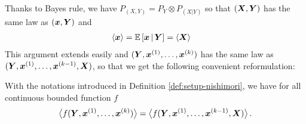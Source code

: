 \documentclass[12pt,nocut]{article}
\begin{document}
Thanks to Bayes rule, we have $P_{(X,Y)} = P_{Y}\!\otimes \! P_{(X|Y)}$ so that $({\boldsymbol X},{\boldsymbol Y})$ has the same law as $({\boldsymbol x},{\boldsymbol Y})$ and
\begin{align*}
\langle {\boldsymbol x} \rangle &= \mathbb{E}\left[ {\boldsymbol x} \, | \, {\boldsymbol Y} \right] = \langle {\boldsymbol X} \rangle
\end{align*}
This argument extends easily and $({\boldsymbol Y},{\boldsymbol x}^{(1)}, \dots, {\boldsymbol x}^{(k)})$ has the same law as $({\boldsymbol Y},{\boldsymbol x}^{(1)}, \dots,{\boldsymbol x}^{(k-1)}, {\boldsymbol X})$, so that we get the following convenient reformulation:
\begin{proposition} \label{prop:nishimori}
With the notations introduced in Definition \ref{def:setup-nishimori}, we have for all continuous bounded function $f$
	$$
\big\langle f({\boldsymbol Y},{\boldsymbol x}^{(1)}, \dots, {\boldsymbol x}^{(k)}) \big\rangle
	=
\big\langle f({\boldsymbol Y},{\boldsymbol x}^{(1)}, \dots, {\boldsymbol x}^{(k-1)}, {\boldsymbol X}) \big\rangle\,.
	$$
\end{proposition}
\end{document}
